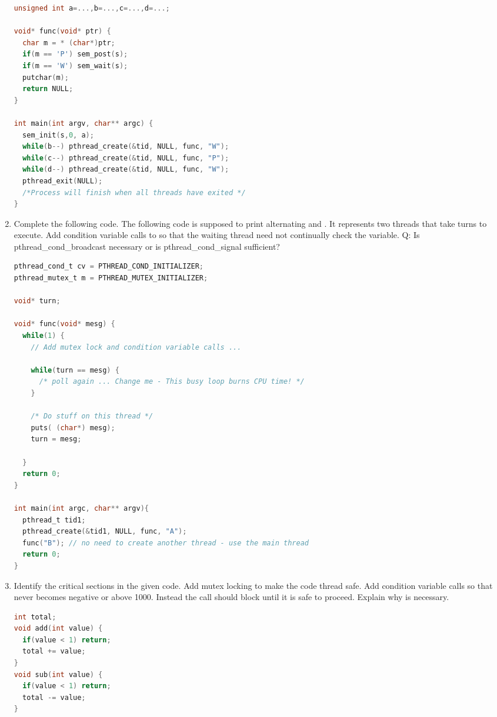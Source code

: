 \begin{enumerate}
\begin{lstlisting}[language=C]
unsigned int a=...,b=...,c=...,d=...;

void* func(void* ptr) {
  char m = * (char*)ptr;
  if(m == 'P') sem_post(s);
  if(m == 'W') sem_wait(s);
  putchar(m);
  return NULL;
}

int main(int argv, char** argc) {
  sem_init(s,0, a);
  while(b--) pthread_create(&tid, NULL, func, "W");
  while(c--) pthread_create(&tid, NULL, func, "P");
  while(d--) pthread_create(&tid, NULL, func, "W");
  pthread_exit(NULL);
  /*Process will finish when all threads have exited */
}
\end{lstlisting}

\item Complete the following code. The following code is supposed to print alternating  and . It represents two threads that take turns to execute. Add condition variable calls to  so that the waiting thread need not continually check the  variable. Q: Is pthread\_cond\_broadcast necessary or is pthread\_cond\_signal sufficient?

\begin{lstlisting}[language=C]
pthread_cond_t cv = PTHREAD_COND_INITIALIZER;
pthread_mutex_t m = PTHREAD_MUTEX_INITIALIZER;

void* turn;

void* func(void* mesg) {
  while(1) {
    // Add mutex lock and condition variable calls ...

    while(turn == mesg) {
      /* poll again ... Change me - This busy loop burns CPU time! */
    }

    /* Do stuff on this thread */
    puts( (char*) mesg);
    turn = mesg;

  }
  return 0;
}

int main(int argc, char** argv){
  pthread_t tid1;
  pthread_create(&tid1, NULL, func, "A");
  func("B"); // no need to create another thread - use the main thread
  return 0;
}
\end{lstlisting}

\item Identify the critical sections in the given code. Add mutex locking to make the code thread safe. Add condition variable calls so that  never becomes negative or above 1000. Instead the call should block until it is safe to proceed. Explain why  is necessary.

\begin{lstlisting}[language=C]
int total;
void add(int value) {
  if(value < 1) return;
  total += value;
}
void sub(int value) {
  if(value < 1) return;
  total -= value;
}
\end{lstlisting}


\end{enumerate}
